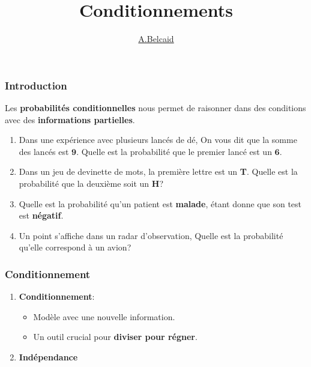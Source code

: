 \documentclass{beamer}
\title{Conditionnements}
\author{\underline{A.Belcaid}}
\institute{\small ENSA-Safi}
\begin{document}
\maketitle

\begin{frame}
\tableofcontents
\end{frame}

\begin{frame}[<+->]
    \frametitle{Introduction}
\scriptsize Les \alert{\textbf{probabilités conditionnelles}}  nous permet de
raisonner dans des conditions avec des \textbf{informations partielles}.\\[8pt]

\begin{enumerate}
    \scriptsize
    \item Dans une expérience avec plusieurs lancés de dé, On vous dit que la
        somme des lancés est $\mathbf{9}$. Quelle est la probabilité que le
        premier lancé est un $\mathbf{6}$.\\[8pt]
    \item Dans un jeu de devinette de mots, la première lettre est un
        \alert{\textbf{T}}. Quelle est la probabilité que la deuxième soit un
        \alert{\textbf{H}}?\\[8pt]
    \item Quelle est la probabilité qu'un patient est \alert{\textbf{malade}},
        étant donne que son test est \textbf{négatif}.\\[8pt]
    \item Un point s'affiche dans un radar d'observation, Quelle est la
        probabilité qu'elle correspond à un avion?
\end{enumerate}
\end{frame}
\begin{frame}[<+->]
    \frametitle{Conditionnement}
    
    \begin{enumerate}
        \item \alert{\textbf{Conditionnement}}:
            \begin{itemize}
                \item Modèle  avec une nouvelle
                    information.\\[8pt]
                \item Un outil crucial pour \textbf{diviser pour régner}.\\[8pt]

            \end{itemize}
        \item \alert{\textbf{Indépendance}} 
    \end{enumerate}
\end{frame}
\end{document}
